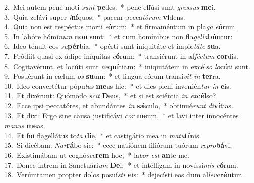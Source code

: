 {2.~}Mei autem pene moti \textit{sunt} \textbf{pe}des:~* pene effúsi sunt \textit{gres}\textit{sus} \textbf{me}i.\\
{3.~}Quia zelávi super \textit{i}\textbf{ní}quos,~* pacem pecca\textit{tó}\textit{rum} \textbf{vi}dens.\\
{4.~}Quia non est respéctus morti \textit{e}\textbf{ó}rum:~* et firmaméntum in pla\textit{ga} \textit{e}\textbf{ó}rum.\\
{5.~}In labóre hómi\textit{num} \textbf{non} sunt:~* et cum homínibus non fla\textit{gel}\textit{la}\textbf{bún}tur:\\
{6.~}Ideo ténuit eos \textit{su}\textbf{pér}bia,~* opérti sunt iniquitáte et impie\textit{tá}\textit{te} \textbf{su}a.\\
{7.~}Pródiit quasi ex ádipe iníquitas \textit{e}\textbf{ó}rum:~* transiérunt in af\textit{fé}\textit{ctum} \textbf{cor}dis.\\
{8.~}Cogitavérunt, et locúti sunt \textit{ne}\textbf{quí}tiam:~* iniquitátem in excél\textit{so} \textit{lo}\textbf{cú}ti sunt.\\
{9.~}Posuérunt in cælum \textit{os} \textbf{su}um:~* et lingua eórum transí\textit{vit} \textit{in} \textbf{ter}ra.\\
{10.~}Ideo convertétur pópu\textit{lus} \textbf{me}us hic:~* et dies pleni invenién\textit{tur} \textit{in} \textbf{e}is.\\
{11.~}Et dixérunt: Quómodo \textit{scit} \textbf{De}us,~* et si est sciéntia \textit{in} \textit{ex}\textbf{cél}so?\\
{12.~}Ecce ipsi peccatóres, et abundántes \textit{in} \textbf{sǽ}culo,~* obtinué\textit{runt} \textit{di}\textbf{ví}tias.\\
{13.~}Et dixi: Ergo sine causa justificávi \textit{cor} \textbf{me}um,~* et lavi inter innocéntes \textit{ma}\textit{nus} \textbf{me}as.\\
{14.~}Et fui flagellátus to\textit{ta} \textbf{di}e,~* et castigátio mea in \textit{ma}\textit{tu}\textbf{tí}nis.\\
{15.~}Si dicébam: \textit{Nar}\textbf{rá}bo sic:~* ecce natiónem filiórum tuórum \textit{re}\textit{pro}\textbf{bá}vi.\\
{16.~}Existimábam ut cognó\textit{sce}\textbf{rem} hoc,~* la\textit{bor} \textit{est} \textbf{an}te me.\\
{17.~}Donec intrem in Sanctuári\textit{um} \textbf{De}i:~* et intélligam in novíssi\textit{mis} \textit{e}\textbf{ó}rum.\\
{18.~}Verúmtamen propter dolos posuí\textit{sti} \textbf{e}is:~* dejecísti eos dum al\textit{le}\textit{va}\textbf{rén}tur.\\
